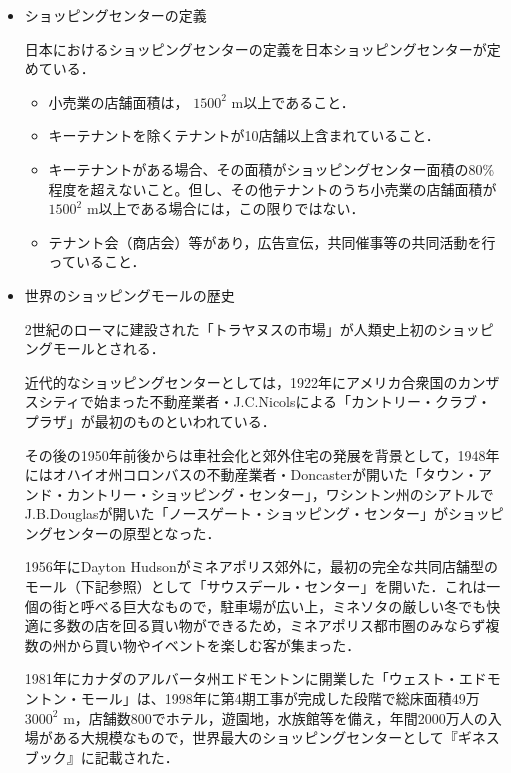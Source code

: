 \begin{itemize}

 \item	ショッピングセンターの定義

日本におけるショッピングセンターの定義を日本ショッピングセンターが定めている．\cite{shopcenter}

\begin{itemize}
\setlength{\parskip}{3mm}


 \item	小売業の店舗面積は， $1500^{2}$ m以上であること．
 \item	キーテナントを除くテナントが10店舗以上含まれていること．
 \item	キーテナントがある場合、その面積がショッピングセンター面積の80\%程度を超えないこと。但し、その他テナントのうち小売業の店舗面積が  $1500^{2}$ m以上である場合には，この限りではない．
 \item	テナント会（商店会）等があり，広告宣伝，共同催事等の共同活動を行っていること．



\end{itemize}

 \item	世界のショッピングモールの歴史

2世紀のローマに建設された「トラヤヌスの市場」が人類史上初のショッピングモールとされる．

近代的なショッピングセンターとしては，1922年にアメリカ合衆国のカンザスシティで始まった不動産業者・J.C.Nicolsによる「カントリー・クラブ・プラザ」が最初のものといわれている．

その後の1950年前後からは車社会化と郊外住宅の発展を背景として，1948年にはオハイオ州コロンバスの不動産業者・Doncasterが開いた「タウン・アンド・カントリー・ショッピング・センター」，ワシントン州のシアトルでJ.B.Douglasが開いた「ノースゲート・ショッピング・センター」がショッピングセンターの原型となった．

1956年にDayton Hudsonがミネアポリス郊外に，最初の完全な共同店舗型のモール（下記参照）として「サウスデール・センター」を開いた．これは一個の街と呼べる巨大なもので，駐車場が広い上，ミネソタの厳しい冬でも快適に多数の店を回る買い物ができるため，ミネアポリス都市圏のみならず複数の州から買い物やイベントを楽しむ客が集まった．

1981年にカナダのアルバータ州エドモントンに開業した「ウェスト・エドモントン・モール」は、1998年に第4期工事が完成した段階で総床面積49万 $3000^{2}$ m，店舗数800でホテル，遊園地，水族館等を備え，年間2000万人の入場がある大規模なもので，世界最大のショッピングセンターとして『ギネスブック』に記載された．


\end{itemize}
